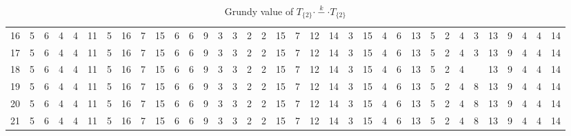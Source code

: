 \documentclass[12pt]{elsarticle}
\newtheorem*{theorem A}{Theorem A}
\newtheorem*{theorem B}{N\"olker's Theorem}
\theoremstyle{remark}
\theoremstyle{remark}
\theoremstyle{definition}
\begin{document}
\begin{landscape}
\begin{table}[]
{\begin{tabular}{c|cccccccccccccccccccccccccccccccccc}
			16 & 5 & 6 & 4 & 4 & 11 & 5 & 16 & 7 & 15 & 6 & 6  & 9  & 3  & 3  & 2  & 2  & 15 & 7  & 12 & 14 & 3  & 15 & 4  & 6  & 13 & 5  & 2  & 4  & 3          & 13 & 9  & 4  & 4  & 14 \\
			17 & 5 & 6 & 4 & 4 & 11 & 5 & 16 & 7 & 15 & 6 & 6  & 9  & 3  & 3  & 2  & 2  & 15 & 7  & 12 & 14 & 3  & 15 & 4  & 6  & 13 & 5  & 2  & 4  & 3          & 13 & 9  & 4  & 4  & 14 \\
			18 & 5 & 6 & 4 & 4 & 11 & 5 & 16 & 7 & 15 & 6 & 6  & 9  & 3  & 3  & 2  & 2  & 15 & 7  & 12 & 14 & 3  & 15 & 4  & 6  & 13 & 5  & 2  & 4  & \boxed{\textbf{3}} & 13 & 9  & 4  & 4  & 14 \\
			19 & 5 & 6 & 4 & 4 & 11 & 5 & 16 & 7 & 15 & 6 & 6  & 9  & 3  & 3  & 2  & 2  & 15 & 7  & 12 & 14 & 3  & 15 & 4  & 6  & 13 & 5  & 2  & 4  & 8          & 13 & 9  & 4  & 4  & 14 \\
			20 & 5 & 6 & 4 & 4 & 11 & 5 & 16 & 7 & 15 & 6 & 6  & 9  & 3  & 3  & 2  & 2  & 15 & 7  & 12 & 14 & 3  & 15 & 4  & 6  & 13 & 5  & 2  & 4  & 8          & 13 & 9  & 4  & 4  & 14 \\
			21 & 5 & 6 & 4 & 4 & 11 & 5 & 16 & 7 & 15 & 6 & 6  & 9  & 3  & 3  & 2  & 2  & 15 & 7  & 12 & 14 & 3  & 15 & 4  & 6  & 13 & 5  & 2  & 4  & 8          & 13 & 9  & 4  & 4  & 14
		\end{tabular}}
		\caption{Grundy value of $T_{\{2\}}\stackrel{k}{\cdot - \cdot} T_{\{2\}}$ \label{T2k2}}
	\end{table}


\end{landscape}
\end{document}
